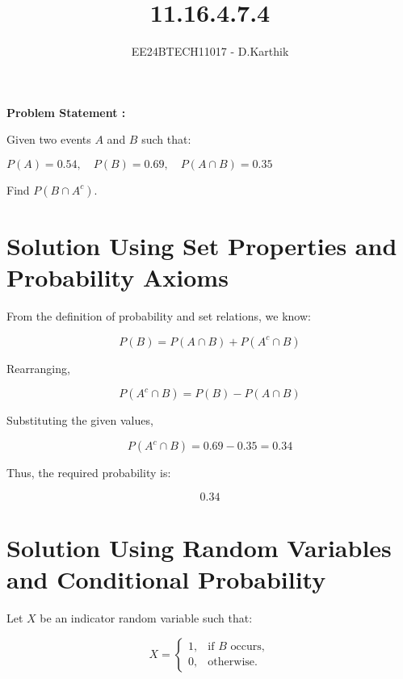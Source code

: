 \documentclass[journal]{IEEEtran}
\begin{document}

\vspace{3cm}

\title{11.16.4.7.4}
\author{EE24BTECH11017 - D.Karthik}
 \maketitle
{\let\newpage\relax\maketitle}

\renewcommand{\thefigure}{\theenumi}
\renewcommand{\thetable}{\theenumi}
\setlength{\intextsep}{10pt} %


\renewcommand{\thetable}{\theenumi}
\textbf{Problem Statement :}

Given two events \( A \) and \( B \) such that:


   $ P(A) = 0.54, \quad P(B) = 0.69, \quad P(A \cap B) = 0.35$

Find \( P(B \cap A^c) \).
\section{Solution Using Set Properties and Probability Axioms}

From the definition of probability and set relations, we know:

\[
P(B) = P(A \cap B) + P(A^c \cap B)
\]

Rearranging,

\[
P(A^c \cap B) = P(B) - P(A \cap B)
\]

Substituting the given values,

\[
P(A^c \cap B) = 0.69 - 0.35 = 0.34
\]

Thus, the required probability is:

\[
\boxed{0.34}
\]

\section{Solution Using Random Variables and Conditional Probability}

Let \( X \) be an indicator random variable such that:

\[
X =
\begin{cases}
1, & \text{if } B \text{ occurs}, \\
0, & \text{otherwise}.
\end{cases}
\]
\end{document}

